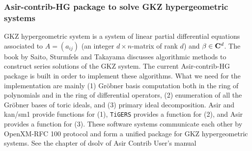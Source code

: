 \subsubsection{Asir-contrib-HG package to solve GKZ hypergeometric systems}

GKZ hypergeometric system is a system of linear partial differential
equations associated to $A=(a_{ij})$  
(an integer $d\times n$-matrix of rank $d$)
and $\beta \in {\bf C}^d$.
The book by Saito, Sturmfels and Takayama \cite{sst-book}
discusses algorithmic methods to construct series solutions of the GKZ
system.
The current Asir-contrib-HG package is built in order to implement
these algorithms.
What we need for the implementation are mainly
(1) Gr\"obner basis computation both in the ring of polynomials
and in the ring of differential operators,
(2) enumeration of all the Gr\"obner bases of toric ideals,
and 
(3) primary ideal decomposition.
Asir and kan/sm1 provide functions for (1),
{\tt TiGERS} provides a function for (2),
and
Asir provides a function for (3).
These software systems communicate each other by OpenXM-RFC 100 protocol
and form a unified package for GKZ hypergeometric systems.
See the chapter of dsolv of Asir Contrib User's manual \cite{openxm-web}

